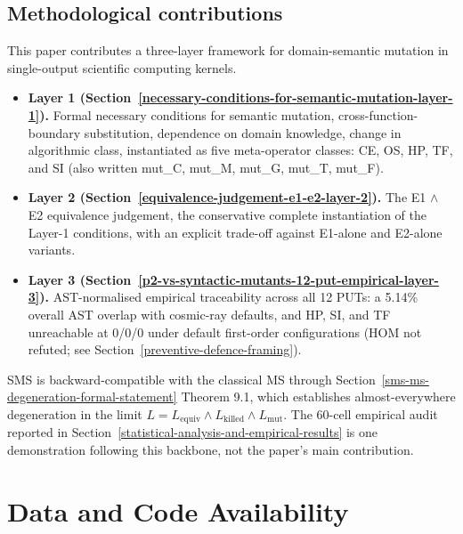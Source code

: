 \documentclass[12pt]{article}
\providecommand{\tightlist}{\setlength{\itemsep}{0pt}\setlength{\parskip}{0pt}}
\begin{document}
\subsection{Methodological contributions}\label{methodological-contributions}

This paper contributes a three-layer framework for domain-semantic
mutation in single-output scientific computing kernels.

\begin{itemize}
\tightlist
\item
  \textbf{Layer 1 (Section~\ref{necessary-conditions-for-semantic-mutation-layer-1}).} Formal necessary conditions for semantic
  mutation, cross-function-boundary substitution, dependence on domain
  knowledge, change in algorithmic class, instantiated as five
  meta-operator classes: CE, OS, HP, TF, and SI (also written mut\_C,
  mut\_M, mut\_G, mut\_T, mut\_F).
\item
  \textbf{Layer 2 (Section~\ref{equivalence-judgement-e1-e2-layer-2}).} The E1 $\wedge$ E2 equivalence judgement, the
  conservative complete instantiation of the Layer-1 conditions, with an
  explicit trade-off against E1-alone and E2-alone variants.
\item
  \textbf{Layer 3 (Section~\ref{p2-vs-syntactic-mutants-12-put-empirical-layer-3}).} AST-normalised empirical traceability across
  all 12 PUTs: a 5.14\% overall AST overlap with cosmic-ray defaults,
  and HP, SI, and TF unreachable at 0/0/0 under default first-order
  configurations (HOM not refuted; see Section~\ref{preventive-defence-framing}).
\end{itemize}

SMS is backward-compatible with the classical MS through Section~\ref{sms-ms-degeneration-formal-statement} Theorem
9.1, which establishes almost-everywhere degeneration in the limit
$L = L_{\mathrm{equiv}} \wedge L_{\mathrm{killed}} \wedge L_{\mathrm{mut}}$. The 60-cell empirical
audit reported in Section~\ref{statistical-analysis-and-empirical-results} is one demonstration following this backbone, not
the paper's main contribution.

\section*{Data and Code Availability}\label{data-and-code-availability}
\end{document}

